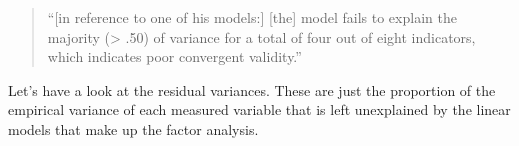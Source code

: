 \documentclass[
  letterpaper,
  DIV=11,
  numbers=noendperiod]{scrreprt}
\newenvironment{Shaded}{\begin{snugshade}}{\end{snugshade}}
\newcommand{\AttributeTok}[1]{\textcolor[rgb]{0.40,0.45,0.13}{#1}}
\newcommand{\FunctionTok}[1]{\textcolor[rgb]{0.28,0.35,0.67}{#1}}
\newcommand{\NormalTok}[1]{\textcolor[rgb]{0.00,0.23,0.31}{#1}}
\newcommand{\OtherTok}[1]{\textcolor[rgb]{0.00,0.23,0.31}{#1}}
\newcommand{\SpecialCharTok}[1]{\textcolor[rgb]{0.37,0.37,0.37}{#1}}
\newcommand{\StringTok}[1]{\textcolor[rgb]{0.13,0.47,0.30}{#1}}
\begin{document}
\begin{quote}
``{[}in reference to one of his models:{]} {[}the{]} model fails to
explain the majority (\textgreater{} .50) of variance for a total of
four out of eight indicators, which indicates poor convergent
validity.''
\end{quote}

Let's have a look at the residual variances. These are just the
proportion of the empirical variance of each measured variable that is
left unexplained by the linear models that make up the factor analysis.

\begin{Shaded}
\end{Shaded}
\end{document}
